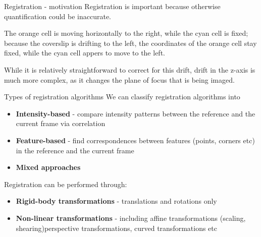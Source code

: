 \documentclass[9pt, aspectratio=169]{beamer}
\begin{document}
\begin{frame}
    {Registration - motivation}
    Registration is important because otherwise quantification could be inaccurate.

    \centering

    \raggedright
    The orange cell is moving horizontally to the right, while the cyan cell is fixed; because the coverslip is drifting to the left, the coordinates of the orange cell stay fixed, while the cyan cell appers to move to the left.

    \pause
    While it is relatively straightforward to correct for this drift, drift in the z-axis is much more complex, as it changes the plane of focus that is being imaged.
\end{frame}

\begin{frame}
    {Types of registration algorithms}
    We can classify registration algorithms into

    \begin{itemize}
        \item \textbf{Intensity-based} - compare intensity patterns between the reference and the current frame via correlation
        \item \textbf{Feature-based} - find correspondences between features (points, corners etc) in the reference and the current frame
        \item \textbf{Mixed approaches}
    \end{itemize}

    \pause
    Registration can be performed through:

    \begin{itemize}
        \item \textbf{Rigid-body transformations} - translations and rotations only
        \item \textbf{Non-linear transformations} - including affine transformations (scaling, shearing)perspective transformations, curved transformations etc
    \end{itemize}
\end{frame}
\end{document}
